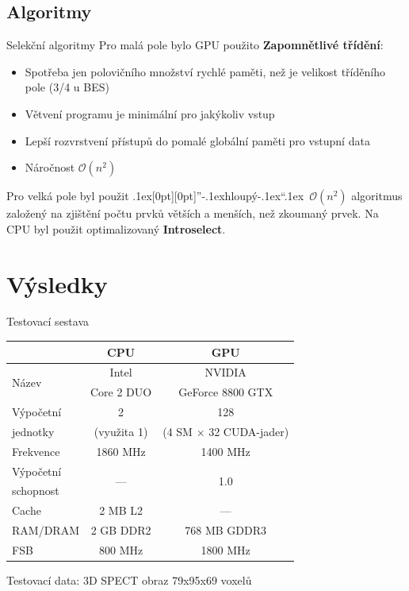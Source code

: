 \documentclass[compress,mathserif]{beamer}
\def\bq{\mbox{\kern.1ex\protect\raisebox{-1.3ex}[0pt][0pt]{''}\kern-.1ex}}
\def\eq{\mbox{\kern-.1ex``\kern.1ex}}
\theoremstyle{definition}
\theoremstyle{plain}
\newcommand{\beI}{\begin{itemize}}
\newcommand{\enI}{\end{itemize}}
\begin{document}
\subsection{Algoritmy}
     \begin{frame}{Selekční algoritmy}
      Pro malá pole bylo GPU použito \textbf{Zapomnětlivé třídění}:
      \beI
        \item Spotřeba jen polovičního množství rychlé paměti, než je velikost tříděního pole (3/4 u BES)
        \item Větvení programu je minimální pro jakýkoliv vstup
        \item Lepší rozvrstvení přístupů do pomalé globální paměti pro vstupní data
        \item Náročnost $\mathcal{O}(n^2)$
      \enI
      Pro velká pole byl použit \bq hloupý\eq~$\mathcal{O}(n^2)$ algoritmus založený na 
      zjištění počtu prvků větších a menších, než zkoumaný prvek.
      \vspace{5pt}
      Na CPU byl použit optimalizovaný \textbf{Introselect}.
    \end{frame}


\section{Výsledky}
    \begin{frame}{Testovací sestava}
        \begin{table}
        \begin{tabular}{lcc}
          \toprule
          & CPU & GPU \\
          \midrule
          \multirow{2}{*}{Název} & Intel & NVIDIA \\
          & Core 2 DUO & GeForce 8800 GTX \\
          Výpočetní & 2 & 128 \\
          jednotky & (využita 1) & (4 SM $\times$ 32 CUDA-jader) \\
          Frekvence & 1860 MHz & 1400 MHz \\
          Výpočetní & \multirow{2}{*}{---} & \multirow{2}{*}{1.0} \\
          schopnost & & \\ 
          Cache & 2 MB L2 & --- \\
          RAM/DRAM & 2 GB DDR2 & 768 MB GDDR3 \\
          FSB & 800 MHz & 1800 MHz \\
          \bottomrule
        \end{tabular}
        \end{table}
        \begin{center}
           Testovací data: 3D SPECT obraz 79x95x69 voxelů
        \end{center}
       
    \end{frame}
    
\end{document}
